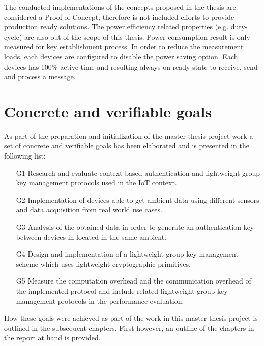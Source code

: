 The conducted implementations of the concepts proposed in the thesis are considered a Proof of Concept, therefore is not included efforts to provide production ready solutions. 
The power efficiency related properties (e.g. duty-cycle) are also out of the scope of this thesis. 
Power consumption result is only measured for key establishment process. 
In order to reduce the measurement loads, each devices are configured to disable the power saving option. 
Each devices has 100\% active time and resulting always on ready state to receive, send and process a message.

\section{Concrete and verifiable goals}
\label{sec:goals}
As part of the preparation and initialization of the master thesis project work a set of concrete and verifiable goals has been elaborated and is presented in the following list:
\begin{itemize}
    \item[G1] Research and evaluate context-based authentication and lightweight group key management protocols used in the IoT context. 
    \item[G2] Implementation of devices able to get ambient data using different sensors and data acquisition from real world use cases.
    \item[G3] Analysis of the obtained data in order to generate an authentication key between devices in located in the same ambient.
    \item[G4] Design and implementation of a lightweight group-key management scheme which uses lightweight cryptographic primitives.  
    \item[G5] Measure the computation overhead and the communication overhead of the implemented protocol and include related lightweight group-key management protocols in the performance evaluation.
\end{itemize}
How these goals were achieved as part of the work in this master thesis project is outlined in the subsequent chapters. First however, an outline of the chapters in the report at hand is provided.


\vspace{2em}


